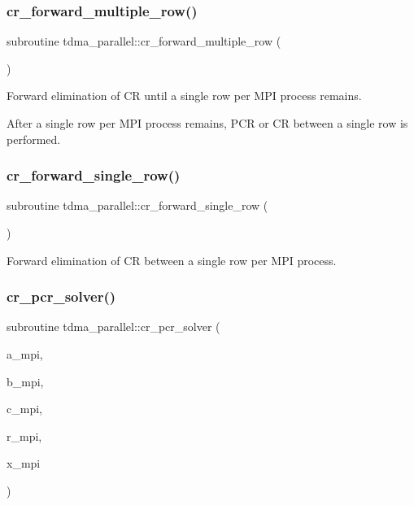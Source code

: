\subsubsection{\texorpdfstring{cr\_forward\_multiple\_row()}{cr\_forward\_multiple\_row()}}
{\footnotesize\ttfamily subroutine tdma\+\_\+parallel\+::cr\+\_\+forward\+\_\+multiple\+\_\+row (\begin{DoxyParamCaption}{ }\end{DoxyParamCaption})}



Forward elimination of CR until a single row per M\+PI process remains. 

After a single row per M\+PI process remains, P\+CR or CR between a single row is performed. \mbox{\label{namespacetdma__parallel_a33fc3b14caafcdd849e1d4c08e766695}} 
\subsubsection{\texorpdfstring{cr\_forward\_single\_row()}{cr\_forward\_single\_row()}}
{\footnotesize\ttfamily subroutine tdma\+\_\+parallel\+::cr\+\_\+forward\+\_\+single\+\_\+row (\begin{DoxyParamCaption}{ }\end{DoxyParamCaption})}



Forward elimination of CR between a single row per M\+PI process. 

\mbox{\label{namespacetdma__parallel_a5b221ee60f9b10b484cd5439f5b485f0}} 
\subsubsection{\texorpdfstring{cr\_pcr\_solver()}{cr\_pcr\_solver()}}
{\footnotesize\ttfamily subroutine tdma\+\_\+parallel\+::cr\+\_\+pcr\+\_\+solver (\begin{DoxyParamCaption}\item[{real(8), dimension(0\+:n\+\_\+mpi+1), intent(inout), target}]{a\+\_\+mpi,  }\item[{real(8), dimension(0\+:n\+\_\+mpi+1), intent(inout), target}]{b\+\_\+mpi,  }\item[{real(8), dimension(0\+:n\+\_\+mpi+1), intent(inout), target}]{c\+\_\+mpi,  }\item[{real(8), dimension(0\+:n\+\_\+mpi+1), intent(inout), target}]{r\+\_\+mpi,  }\item[{real(8), dimension(0\+:n\+\_\+mpi+1), intent(inout), target}]{x\+\_\+mpi }\end{DoxyParamCaption})}



